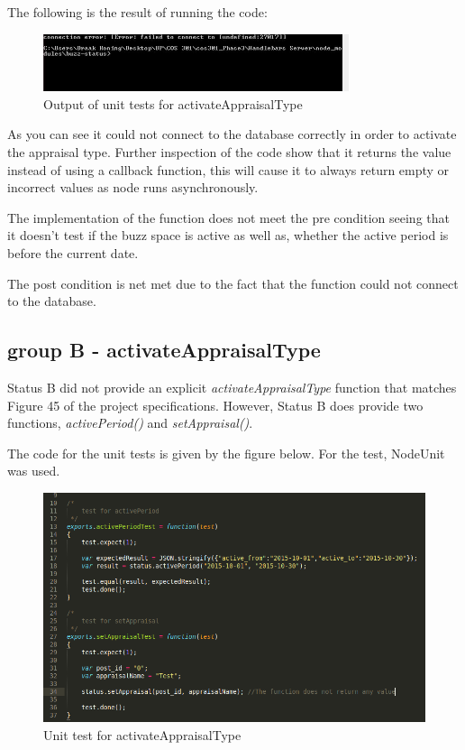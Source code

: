 \documentclass[a4paper,12pt]{article}
\begin{document}
The following is the result of running the code:

	\begin{figure}[H]
		\centering
		\includegraphics[width=0.8\textwidth]{Figures/activateTypeAResult.JPG}
		\caption{Output of unit tests for activateAppraisalType}
	\end{figure}

As you can see it could not connect to the database correctly in order to activate the appraisal type. Further inspection of the code show that it returns the value instead of using a callback function, this will cause it to always return empty or incorrect values as node runs asynchronously.

The implementation of the function does not meet the pre condition seeing that it doesn't test if the buzz space is active as well as, whether the active period is before the current date.

The post condition is net met due to the fact that the function could not connect to the database.

\subsection{group B - activateAppraisalType}

Status B did not provide an explicit \textit{activateAppraisalType} function that matches Figure 45 of the project specifications.
However, Status B does provide two functions, \textit{activePeriod()} and \textit{setAppraisal()}.

The code for the unit tests is given by the figure below. For the test, NodeUnit was used.

	\begin{figure}[H]
		\centering
		\includegraphics[width=1.0\textwidth]{Figures/activateAppraisalTypeUnitTests.png}
		\caption{Unit test for activateAppraisalType}
	\end{figure}
\end{document}
